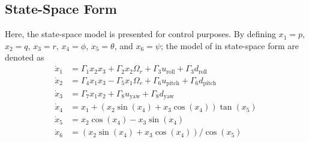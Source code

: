 \documentclass[3p,times]{elsarticle}
\begin{document}
\subsection{State-Space Form}\label{sec:state-space}
\noindent Here, the state-space model is presented for control purposes.
By defining $x_1 = p$, $x_2 = q$, $x_3 = r$, $x_4 = \phi$, $x_5 = \theta$, and $x_6 = \psi$; the model of in state-space form are denoted as
\begin{align}\label{eq:diffeq}
	\dot x_1 &= \Gamma_1x_2 x_3 + \Gamma_2 x_2 \Omega_r + \Gamma_3u_{\text{roll}} + \Gamma_3d_{\text{roll}} \\[0.5em]
\dot x_2 &= \Gamma_4 x_1 x_3 - \Gamma_5 x_1 \Omega_r +  \Gamma_6u_{\text{pitch}} + \Gamma_6d_{\text{pitch}}\\[0.5em] \label{eq:diffeq-mid}
\dot x_3 &= \Gamma_7x_1 x_2 +  \Gamma_8u_{\text{yaw}} + \Gamma_8d_{\text{yaw}}\\[0.5em] 
\dot x_4 &= x_1 + (x_2\sin(x_4) + x_3\cos(x_4))\tan(x_5)
\\[0.5em]
\dot x_5 &= x_2\cos(x_4) - x_3\sin(x_4)\\[0.5em]
\dot x_6 &= (x_2\sin(x_4) + x_3\cos(x_4))/\cos(x_5) \label{eq:diffeq-end}
\end{align}
\end{document}
